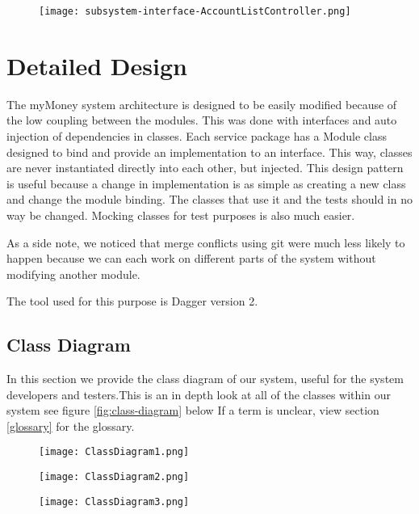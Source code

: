 \documentclass[12pt]{article}
\begin{document}
\begin{figure}[H]
\texttt{[image: subsystem-interface-AccountListController.png]}
\end{figure}

\clearpage

\section{Detailed Design} \label{sec:detail}

The myMoney system architecture is designed to be easily modified because of the low coupling between the modules. This was done with interfaces and auto injection of dependencies in classes. Each service package has a Module class designed to bind and provide an implementation to an interface. This way, classes are never instantiated directly into each other, but injected. This design pattern is useful because a change in implementation is as simple as creating a new class and change the module binding. The classes that use it and the tests should in no way be changed. Mocking classes for test purposes is also much easier.

As a side note, we noticed that merge conflicts using git were much less likely to happen because we can each work on different parts of the system without modifying another module.

The tool used for this purpose is Dagger version 2.

\subsection{Class Diagram}

In this section we provide the class diagram of our system, useful for the system developers and testers.This is an in depth look at all of the classes within our system see figure \ref{fig:class-diagram} below If a term is unclear, view section \ref{glossary} for the glossary.

\begin{figure}[H]
\texttt{[image: ClassDiagram1.png]}
\end{figure}

\begin{figure}[H]
\texttt{[image: ClassDiagram2.png]}
\end{figure}

\begin{figure}[H]
\texttt{[image: ClassDiagram3.png]}
\end{figure}
\end{document}
